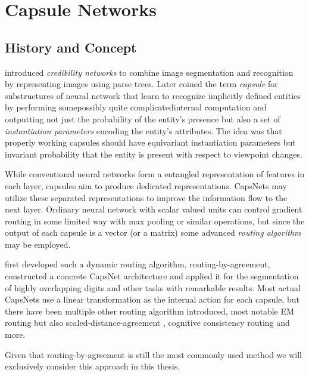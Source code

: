 
\section{Capsule Networks}
\label{sec:capsules}

\subsection{History and Concept}

\citet{parse} introduced \emph{credibility networks} to combine image segmentation and recognition by representing images using parse trees.
Later \citet{transformingauto} coined the term \emph{capsule} for substructures of neural network that learn to recognize implicitly defined entities by performing some\textemdash possibly quite complicated\textemdash internal computation and outputting not just the probability of the entity's presence but also a set of \emph{instantiation parameters} encoding the entity's attributes.
The idea was that properly working capsules should have equivariant instantiation parameters but invariant probability that the entity is present with respect to viewpoint changes.

While conventional neural networks form a entangled representation of features in each layer, capsules aim to produce dedicated representations.
CapsNets may utilize these separated representations to improve the information flow to the next layer.
Ordinary neural network with scalar valued units can control gradient routing in some limited way with max pooling or similar operations, but since the output of each capsule is a vector (or a matrix) some advanced \emph{routing algorithm} may be employed.

\citet{capsules} first developed such a dynamic routing algorithm, routing-by-agreement, constructed a concrete CapsNet architecture and applied it for the segmentation of highly overlapping digits and other tasks with remarkable results.
Most actual CapsNets use a linear transformation as the internal action for each capsule, but there have been multiple other routing algorithm introduced, most notable EM routing \citep{em} but also scaled-distance-agreement \citep{scaledagreement}, cognitive consistency routing \citep{cognitive} and more.

Given that routing-by-agreement is still the most commonly used method we will exclusively consider this approach in this thesis.

